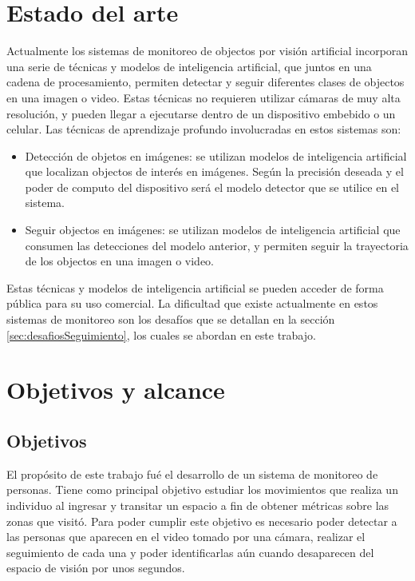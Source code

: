 \section{Estado del arte}
\label{sec:estadoDelArte}

Actualmente los sistemas de monitoreo de objectos por visión artificial incorporan una serie de técnicas y modelos de inteligencia artificial, que juntos en una cadena de procesamiento, permiten detectar y seguir diferentes clases de objectos en una imagen o video. Estas técnicas no requieren utilizar cámaras de muy alta resolución, y pueden llegar a ejecutarse dentro de un dispositivo embebido o un celular. Las técnicas de aprendizaje profundo involucradas en estos sistemas son:

\begin{itemize}
\item Detección de objetos en imágenes: se utilizan modelos de inteligencia artificial que localizan objectos de interés en imágenes. Según la precisión deseada y el poder de computo del dispositivo será el modelo detector que se utilice en el sistema.
\item Seguir objectos en imágenes: se utilizan modelos de inteligencia artificial que consumen las detecciones del modelo anterior, y permiten seguir la trayectoria de los objectos en una imagen o video.
\end{itemize}

Estas técnicas y modelos de inteligencia artificial se pueden acceder de forma pública para su uso comercial. La dificultad que existe actualmente en estos sistemas de monitoreo son los desafíos que se detallan en la sección \ref{sec:desafiosSeguimiento}, los cuales se abordan en este trabajo.


\section{Objetivos y alcance}
\label{sec:objetivosAlcance}

\subsection{Objetivos}

El propósito de este trabajo fué el desarrollo de un sistema de monitoreo de personas. Tiene como principal objetivo estudiar los movimientos que realiza un individuo al ingresar y transitar un espacio a fin de obtener métricas sobre las zonas que visitó. Para poder cumplir este objetivo es necesario poder detectar a las personas que aparecen en el video tomado por una cámara, realizar el seguimiento de cada una y poder identificarlas aún cuando desaparecen del espacio de visión por unos segundos.

